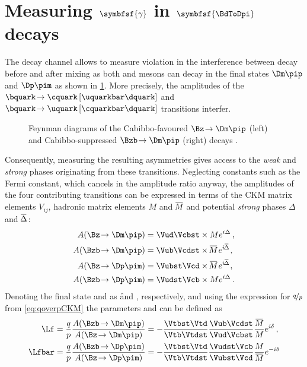 \section[head={Measuring $\gamma$ in $\BdToDpi$ decays},tocentry={Measuring $\gamma$ in $\BdToDpi$ decays}]{Measuring $\symbfsf{\gamma}$ in $\symbfsf{\BdToDpi} $ decays}
\label{sec:GammaInBd2Dpi}

The decay channel \BdToDpi allows to measure \CP violation in the interference between decay before and after mixing as both \Bz and \Bzb mesons can decay in the final states $\Dm\pip$ and $\Dp\pim$ as shown in \cref{fig:feynmanBd2Dpi}.
More precisely, the amplitudes of the $\bquark\!\to\cquark\left[\uquarkbar\dquark\right]$ and $\bquark\!\to\uquark\left[\cquarkbar\dquark\right]$ transitions interfer.
\begin{figure}[tbp]
	\centering
	
	
	\caption{Feynman diagrams of the Cabibbo-favoured $\Bz\!\to\Dm\pip$ (left) and Cabibbo-suppressed $\Bzb\!\to\Dm\pip$ (right) decays \cite{Ellis:2016jkw}.}
	\label{fig:feynmanBd2Dpi}
\end{figure}
Consequently, measuring the resulting \CP asymmetries gives access to the \emph{weak} and \emph{strong} phases originating from these transitions.
Neglecting constants such as the Fermi constant, which cancels in the amplitude ratio anyway, the amplitudes of the four contributing transitions can be expressed in terms of the CKM matrix elements $V_{ij}^{\phantom{\ast}}$, hadronic matrix elements $M$ and $\overline{\kern -1.0pt M\kern -1.0pt}$ and potential \emph{strong} phases $\Delta$ and $\overline{\kern -1.0pt \Delta\kern -1.0pt}\,$:
\begin{align}
A\!\left(\Bz\!\to\Dm\pip\right)&=\Vud\Vcbst\times Me^{i\Delta}\,,\\
A\!\left(\Bzb\!\to\Dm\pip\right)&=\Vub\Vcdst\times \overline{\kern -1.0pt M\kern -1.0pt}\,e^{i\overline{\kern -1.0pt \Delta\kern -1.0pt}}\,,\\
A\!\left(\Bz\!\to\Dp\pim\right)&=\Vubst\Vcd\times \overline{\kern -1.0pt M\kern -1.0pt}\,e^{i\overline{\kern -1.0pt \Delta\kern -1.0pt}}\,,\\
A\!\left(\Bzb\!\to\Dp\pim\right)&=\Vudst\Vcb\times Me^{i\Delta}\,.
\end{align}
Denoting the final state \Dm\pip and \Dp\pim as \f and \fbar, respectively, and using the expression for $\nicefrac{q}{p}$ from \cref{eq:qoverpCKM} the parameters \Lf and \Lfbar can be defined as
\begin{align}
\Lf&=\frac{q}{p}\frac{A\!\left(\Bzb\!\to\Dm\pip\right)}{A\!\left(\Bz\!\to\Dm\pip\right)}=-\frac{\Vtbst\Vtd}{\Vtb\Vtdst}\frac{\Vub\Vcdst}{\Vud\Vcbst}\frac{\overline{\kern -1.0pt M\kern -1.0pt}}{M}e^{i\delta}\,,\\
\Lfbar&=\frac{q}{p}\frac{A\!\left(\Bzb\!\to\Dp\pim\right)}{A\!\left(\Bz\!\to\Dp\pim\right)}=-\frac{\Vtbst\Vtd}{\Vtb\Vtdst}\frac{\Vudst\Vcb}{\Vubst\Vcd}\frac{M}{\overline{\kern -1.0pt M\kern -1.0pt}}e^{-i\delta}
\end{align}
